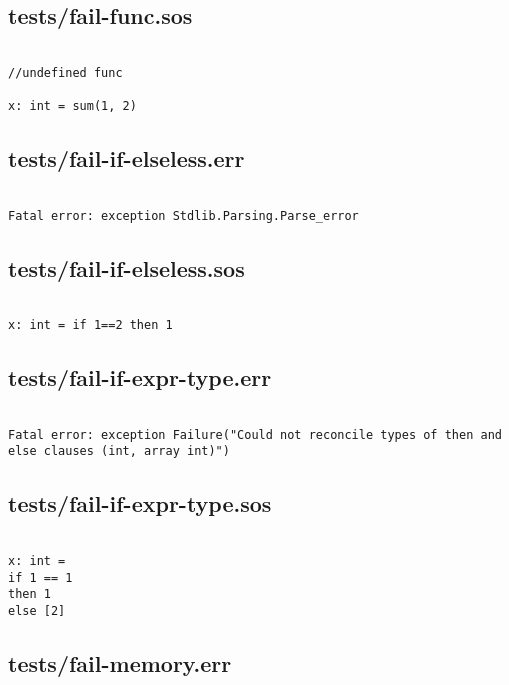\documentclass[main.tex]{subfiles}
\begin{document}
\subsection{tests/fail-func.sos}

\begin{lstlisting}

//undefined func

x: int = sum(1, 2)
\end{lstlisting}

\subsection{tests/fail-if-elseless.err}

\begin{lstlisting}

Fatal error: exception Stdlib.Parsing.Parse_error
\end{lstlisting}

\subsection{tests/fail-if-elseless.sos}

\begin{lstlisting}

x: int = if 1==2 then 1
\end{lstlisting}

\subsection{tests/fail-if-expr-type.err}

\begin{lstlisting}

Fatal error: exception Failure("Could not reconcile types of then and else clauses (int, array int)")
\end{lstlisting}

\subsection{tests/fail-if-expr-type.sos}

\begin{lstlisting}

x: int = 
if 1 == 1 
then 1
else [2]
\end{lstlisting}

\subsection{tests/fail-memory.err}
\end{document}
